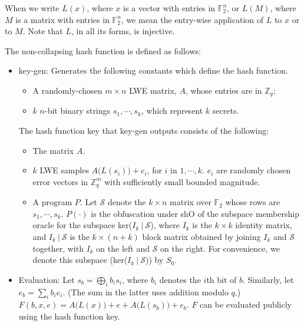 \documentclass{article}
\begin{document}
When we write $L(x)$, where $x$ is a vector with entries in $\mathbb{F}_2^n$, or $L(M)$, where $M$ is a matrix with entries in $\mathbb{F}_2^n$, we mean the entry-wise application of $L$ to $x$ or to $M$. Note that $L$, in all its forms, is injective.

The non-collapsing hash function is defined as follows:
\begin{itemize}
    \item \textsf{key-gen}: Generates the following constants which define the hash function.
    \begin{itemize}
        \item A randomly-chosen $m \times n$ LWE matrix, $A$, whose entries are in $\mathbb{Z}_q$;
        \item $k$ $n$-bit binary strings $s_1, \cdots, s_k$, which represent $k$ secrets.
    \end{itemize}
    The hash function key that \textsf{key-gen} outputs consists of the following:
    \begin{itemize}
			\item The matrix $A$.
			\item $k$ LWE samples $A\big( L(s_i) \big) + e_i$, for $i$ in $1, \cdots, k$. $e_i$ are randomly chosen error vectors in $\mathbb{Z}_q^m$ with sufficiently small bounded magnitude.
        \item A program $P$. Let $\mathcal{S}$ denote the $k \times n$ matrix over $\mathbb{F}_2$ whose rows are $s_1, \cdots, s_k$. $P(\cdot)$ is the obfuscation under \textsf{shO} of the subspace membership oracle for the subspace ker($I_k \: | \: \mathcal{S}$), where $I_k$ is the $k \times k$ identity matrix, and $I_k \: | \: \mathcal{S}$ is the $k \times (n+k)$ block matrix obtained by joining $I_k$ and $\mathcal{S}$ together, with $I_k$ on the left and $\mathcal{S}$ on the right. For convenience, we denote this subspace (ker($I_k \: | \: \mathcal{S}$)) by $S_0$.
    \end{itemize}
    \item Evaluation: Let $s_b = \bigoplus_i b_i s_i$, where $b_i$ denotes the $i$th bit of $b$. Similarly, let $e_b = \sum_i b_i e_i$. (The sum in the latter uses addition modulo $q$.) $F(b, x, e) = A\big( L(x) \big) + e + A\big( L(s_b) \big) + e_b$. $F$ can be evaluated publicly using the hash function key.
\end{itemize}
\end{document}

